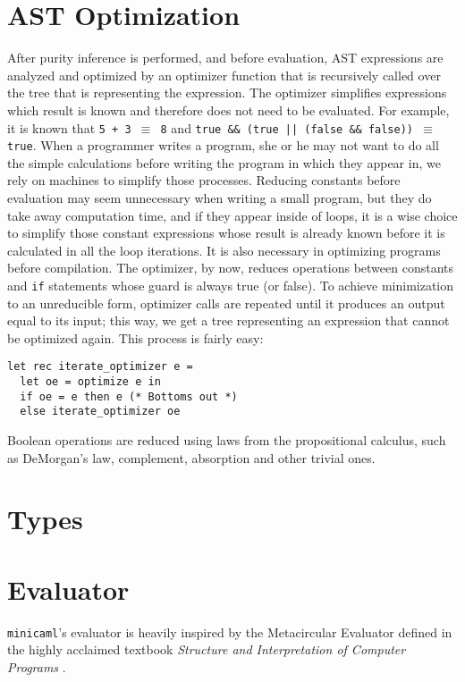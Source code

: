 \documentclass[a4paper, 10pt]{article}
\theoremstyle{plain}%
\theoremstyle{definition}
\theoremstyle{remark}
\begin{document}
\begin{multicols}{2}
\section{AST Optimization}
After purity inference is performed, and before evaluation, AST expressions are analyzed and optimized by an
optimizer function that is recursively called over the tree that is representing
the expression. The optimizer simplifies expressions which result is known and
therefore does not need to be evaluated. For example, it is known that \texttt{5
+ 3 $\equiv$ 8} and \texttt{true \&\& (true || (false \&\& false)) $\equiv$
true}. When a programmer writes a program, she or he may not want to do all the
simple calculations before writing the program in which they appear in, we rely
on machines to simplify those processes. Reducing constants before evaluation
may seem unnecessary when writing a small program, but they do take away
computation time, and if they appear inside of loops, it is a wise choice to
simplify those constant expressions whose result is already known before it is
calculated in all the loop iterations. It is also necessary in optimizing
programs before compilation. The optimizer, by now, reduces operations between
constants and \texttt{if} statements whose guard is always true (or false). To
achieve minimization to an unreducible form, optimizer calls are repeated until
it produces an output equal to its input; this way, we get a tree representing
an expression that cannot be optimized again. This process is fairly easy:

\begin{lstlisting}[style=caml]
let rec iterate_optimizer e =
  let oe = optimize e in
  if oe = e then e (* Bottoms out *)
  else iterate_optimizer oe
\end{lstlisting}

Boolean operations are reduced using laws from the propositional calculus, such as DeMorgan's law, complement, absorption and other trivial ones.

\section{Types}

\section{Evaluator}
\texttt{minicaml}'s evaluator is heavily inspired by the Metacircular Evaluator defined in the
highly acclaimed textbook \textit{Structure and Interpretation of Computer Programs} \cite{Abelson1996}.


\end{multicols}
\end{document}
